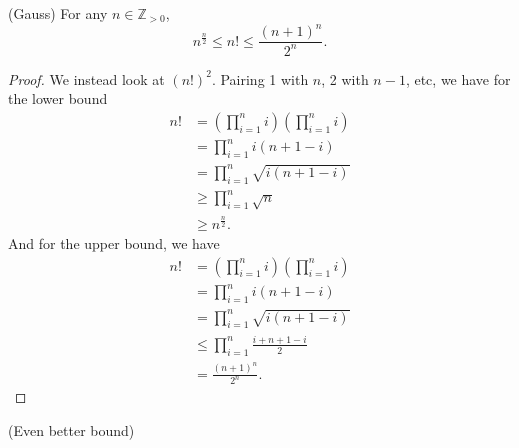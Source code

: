 \begin{theorem}
	(Gauss) For any \( n \in \mathbb{Z}_{>0} \), \[
		n^{\frac{n}{2}} \le n! \le \frac{(n+1)^{n} }{2^{n} }
	.\] 
\end{theorem}
\begin{proof}
	We instead look at \( (n!)^{2}  \). Pairing 1 with \( n \), 2 with \( n-1 \), etc, we have for the lower bound
	\begin{align*}
		n! &= \left( \prod_{i=1}^{n}i  \right) \left( \prod_{i=1}^{n}i  \right) \\
		&= \prod_{i=1}^{n}i(n + 1 - i)  \\
		&= \prod_{i=1}^{n}\sqrt{i(n+1-i)}   \\
		&\ge \prod_{i=1}^{n}\sqrt{n} \tag{Lemma 7}  \\
		&\ge n^{\frac{n}{2}} 
	.\end{align*}
	And for the upper bound, we have 
	\begin{align*}
		n! &= \left( \prod_{i=1}^{n}i  \right) \left( \prod_{i=1}^{n}i  \right) \\
		&= \prod_{i=1}^{n}i(n + 1 - i)  \\
		&= \prod_{i=1}^{n}\sqrt{i(n+1-i)}   \\
		&\le \prod_{i=1}^{n} \frac{i + n + 1 - i}{2}  \\
		&=  \frac{(n+1)^{n} }{2^{n} }
	.\end{align*}
\end{proof}

\begin{theorem}
	(Even better bound)
\end{theorem}


